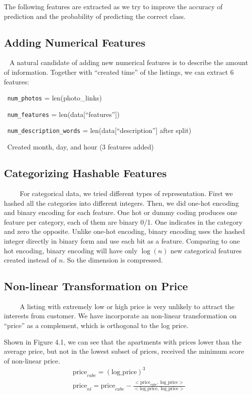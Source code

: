 \documentclass{article}
\begin{document}
The following features are extracted as we try to improve the accuracy of prediction and the probability of predicting the correct class. 

\subsection{Adding Numerical Features}

~ A natural candidate of adding new numerical features is to describe the amount of information. Together with ``created time'' of the listings, we can extract 6 features:\vspace{1.0em}

  \texttt{\indent\textbullet ~num\_photos} = len(photo\_links)
  
  \texttt{\indent\textbullet ~num\_features} = len(data[``features''])
  
  \texttt{\indent\textbullet ~num\_description\_words} = len(data[``description''] after split) 
  
  \texttt{\indent\textbullet} ~Created month, day, and hour (3 features added)

\subsection{Categorizing Hashable Features}

~~~~ For categorical data, we tried different types of representation. First we hashed all the categories into different integers. Then, we did one-hot encoding and binary encoding for each feature.
One hot or dummy coding produces one feature per category, each of them are binary 0/1. One indicates in the category and zero the opposite. Unlike one-hot encoding, binary encoding uses the hashed integer directly in binary form and use each bit as a feature. Comparing to one hot encoding, binary encoding will have only $\log(n)$ new categorical features created instead of $n$. So the dimension is compressed.

\subsection{Non-linear Transformation on Price}

~~~~ A listing with extremely low or high price is very unlikely to attract the interests from customer. We have incorporate an non-linear transformation on ``price'' as a complement, which is orthogonal to the log price. 

Shown in Figure 4.1, we can see that the apartments with prices lower than the average price, but not in the lowest subset of prices, received the minimum score of non-linear price. 
\begin{align*}
&\text{price}_{cube} = (\text{log\_price})^3 \\
&\text{price}_{nl} = \text{price}_{cube} - \frac{<\text{price}_{cube}, ~\text{log\_price}>}{<\text{log\_price}, ~\text{log\_price}>}
\end{align*}
\end{document}
